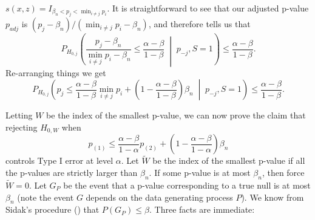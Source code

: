 \documentclass{article}
\begin{document}
\begin{appendix}
$s(x, z) = I_{\beta_n < p_j < \min_{i \neq j} p_i}$. It is straightforward to see that our adjusted p-value $p_{adj}$ is $(p_j - \beta_n)/(\min_{i \neq j} p_i - \beta_n)$, and  therefore tells us that 
\begin{equation*}
    P_{H_{0, j}}\left( \frac{p_j - \beta_n}{\min_{i \neq j} p_i - \beta_n} \leq \frac{\alpha -\beta}{1-\beta}  \;\middle|\; p_{-j}, S=1 \right) \leq \frac{\alpha - \beta}{1-\beta}.
\end{equation*}
Re-arranging things we get 
\begin{equation}
    \label{eq:hybrid_tool}
    P_{H_{0, j}}\left( p_j  \leq \frac{\alpha -\beta}{1-\beta}\min_{i \neq j} p_i  + \left( 1 - \frac{\alpha -\beta}{1-\beta}\right) \beta_n  \;\middle|\; p_{-j}, S=1  \right) \leq \frac{\alpha - \beta}{1-\beta}.
\end{equation}


Letting $W$ be the index of the smallest p-value, we can now prove the claim that rejecting $H_{0, W}$ when 
\begin{equation*}
    p_{(1)} \leq \frac{\alpha-\beta}{1-\alpha} p_{(2)} + \left(1 - \frac{\alpha-\beta}{1-\alpha} \right) \beta_n 
\end{equation*}
controls Type I error at level $\alpha$. Let $\widetilde{W}$ be the index of the smallest p-value if all the p-values are strictly larger than $\beta_n$. If some p-value is at most $\beta_n$, then force $\widetilde{W}=0$. Let $G_P$ be the event that a p-value corresponding to a true null is at most $\beta_n$ (note the event $G$ depends on the data generating process $P$). We know from Sidak's procedure () that $P(G_P) \leq \beta$. Three facts are immediate: 


\end{appendix}
\end{document}
